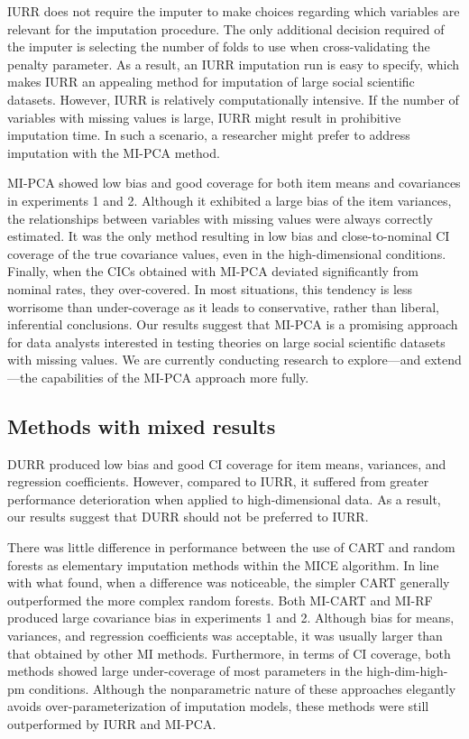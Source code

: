 	IURR does not require the imputer to make choices regarding which variables
	are relevant for the imputation procedure.
	The only additional decision required of the imputer is selecting the number of folds to use when cross-validating the penalty parameter.
	As a result, an IURR imputation run is easy to specify, which makes IURR an appealing method for imputation of large social scientific 
	datasets.
	However, IURR is relatively computationally intensive.
	If the number of variables with missing values is large, IURR might result in prohibitive imputation time.
	In such a scenario, a researcher might prefer to address imputation with the MI-PCA method.

	MI-PCA showed low bias and good coverage for both item means and covariances in experiments 1 and 2.
	Although it exhibited a large bias of the item variances, the relationships between variables with missing values 
	were always correctly estimated.
	It was the only method resulting in low bias and close-to-nominal CI coverage of the true covariance values,
	even in the high-dimensional conditions.
	Finally, when the CICs obtained with MI-PCA deviated significantly from nominal rates, they over-covered.
	In most situations, this tendency is less worrisome than under-coverage as it leads to conservative, rather than liberal, 
	inferential conclusions.
	Our results suggest that MI-PCA is a promising approach for data analysts interested in testing theories on 
	large social scientific datasets with missing values. We are currently conducting research to explore---and extend---the capabilities of the MI-PCA approach more fully.

\subsection{Methods with mixed results}
	DURR produced low bias and good CI coverage for item means, variances, and regression coefficients.
	However, compared to IURR, it suffered from greater performance deterioration when applied to 
	high-dimensional data. 
	As a result, our results suggest that DURR should not be preferred to IURR.

	There was little difference in performance between the use of CART and random forests as elementary imputation methods within the MICE algorithm.
	In line with what \cite{dooveEtAl:2014} found, when a difference was noticeable, the simpler CART generally outperformed the more complex random forests.
	Both MI-CART and MI-RF produced large covariance bias in experiments 1 and 2.
	Although bias for means, variances, and regression coefficients was acceptable, it was usually larger 
	than that obtained by other MI methods.
	Furthermore, in terms of CI coverage, both methods showed large under-coverage of most parameters in 
	the high-dim-high-pm conditions.
	Although the nonparametric nature of these approaches elegantly avoids over-parameterization of imputation models,
	these methods were still outperformed by IURR and MI-PCA.

